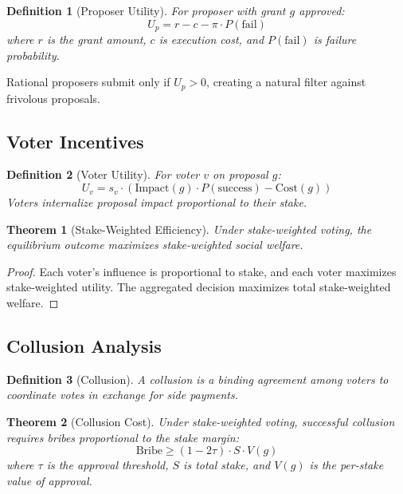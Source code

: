 \documentclass[11pt,a4paper]{article}
\newtheorem{definition}{Definition}
\newtheorem{theorem}{Theorem}
\begin{document}
\begin{definition}[Proposer Utility]
For proposer with grant $g$ approved:
\[
U_p = r - c - \pi \cdot P(\text{fail})
\]
where $r$ is the grant amount, $c$ is execution cost, and $P(\text{fail})$ is failure probability.
\end{definition}

Rational proposers submit only if $U_p > 0$, creating a natural filter against frivolous proposals.

\subsection{Voter Incentives}

\begin{definition}[Voter Utility]
For voter $v$ on proposal $g$:
\[
U_v = s_v \cdot \left( \text{Impact}(g) \cdot P(\text{success}) - \text{Cost}(g) \right)
\]
Voters internalize proposal impact proportional to their stake.
\end{definition}

\begin{theorem}[Stake-Weighted Efficiency]
Under stake-weighted voting, the equilibrium outcome maximizes stake-weighted social welfare.
\end{theorem}

\begin{proof}
Each voter's influence is proportional to stake, and each voter maximizes stake-weighted utility. The aggregated decision maximizes total stake-weighted welfare.
\end{proof}

\subsection{Collusion Analysis}

\begin{definition}[Collusion]
A collusion is a binding agreement among voters to coordinate votes in exchange for side payments.
\end{definition}

\begin{theorem}[Collusion Cost]
Under stake-weighted voting, successful collusion requires bribes proportional to the stake margin:
\[
\text{Bribe} \geq (1 - 2\tau) \cdot S \cdot V(g)
\]
where $\tau$ is the approval threshold, $S$ is total stake, and $V(g)$ is the per-stake value of approval.
\end{theorem}
\end{document}

